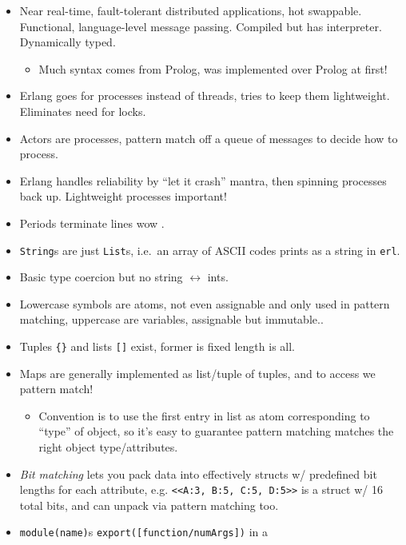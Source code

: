 \documentclass[10pt]{article}
\begin{document}
\begin{itemize}
    \item Near real-time, fault-tolerant distributed applications, hot
        swappable. Functional, language-level message passing. Compiled but has
        interpreter. Dynamically typed.
        \begin{itemize}
            \item Much syntax comes from Prolog, was implemented over Prolog at
                first!
        \end{itemize}
    \item Erlang goes for processes instead of threads, tries to keep them
        lightweight. Eliminates need for locks.
    \item Actors are processes, pattern match off a queue of messages to decide
        how to process.
    \item Erlang handles reliability by ``let it crash'' mantra, then spinning
        processes back up. Lightweight processes important!
    \item Periods terminate lines wow \smiley.
    \item \lstinline{String}s are just \lstinline{List}s, i.e.\ an array of
        ASCII codes prints as a string in \lstinline{erl}.
    \item Basic type coercion but no string $\leftrightarrow$ ints.
    \item Lowercase symbols are atoms, not even assignable and only used in
        pattern matching, uppercase are variables, assignable but immutable..
    \item Tuples \lstinline|{}| and lists \lstinline{[]} exist, former is fixed
        length is all.
    \item Maps are generally implemented as list/tuple of tuples, and to access
        we pattern match!
        \begin{itemize}
            \item Convention is to use the first entry in list as atom
                corresponding to ``type'' of object, so it's easy to guarantee
                pattern matching matches the right object type/attributes.
        \end{itemize}
    \item \emph{Bit matching} lets you pack data into effectively structs w/
        predefined bit lengths for each attribute, e.g.
        \lstinline{<<A:3, B:5, C:5, D:5>>} is a struct w/ 16 total bits, and
        can unpack via pattern matching too.
    \item \lstinline{module(name)}s \lstinline{export([function/numArgs])} in a

\end{itemize}
\end{document}
